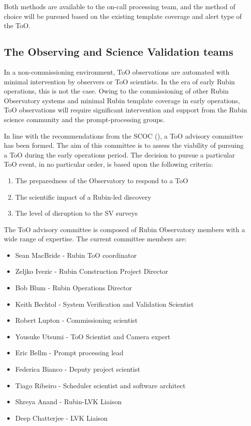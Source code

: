 Both methods are available to the on-call processing team, and the method of choice will be pursued based on the existing template coverage and alert type of the ToO.

\subsection{The Observing and Science Validation teams}\label{subsec:ObsSVTeams}

In a non-commissioning environment, ToO observations are automated with minimal intervention by observers or ToO scientists. In the era of early Rubin operations, this is not the case. Owing to the commissioning of other Rubin Observatory systems and minimal Rubin template coverage in early operations, ToO observations will require significant intervention and support from the Rubin science community and the prompt-processing groups. 

In line with the recommendations from the SCOC (\cite{PSTN-056}), a ToO advisory committee has been formed. The aim of this committee is to assess the viability of pursuing a ToO during the early operations period. The decision to pursue a particular ToO event, in no particular order, is based upon the following criteria:

\begin{enumerate}
    \item The preparedness of the Observatory to respond to a ToO
    \item The scientific impact of a Rubin-led discovery
    \item The level of disruption to the SV surveys
\end{enumerate}

The ToO advisory committee is composed of Rubin Observatory members with a wide range of expertise. The current committee members are:

\begin{itemize}

    \item Sean MacBride - Rubin ToO coordinator
    \item Zeljko Ivezic - Rubin Construction Project Director
    \item Bob Blum - Rubin Operations Director
    \item Keith Bechtol - System Verification and Validation Scientist
    \item Robert Lupton - Commissioning scientist
    \item Yousuke Utsumi - ToO Scientist and Camera expert
    \item Eric Bellm - Prompt processing lead
    \item Federica Bianco - Deputy project scientist
    \item Tiago Ribeiro - Scheduler scientist and software architect
    \item Shreya Anand - Rubin-LVK Liaison
    \item Deep Chatterjee - LVK Liaison
\end{itemize}